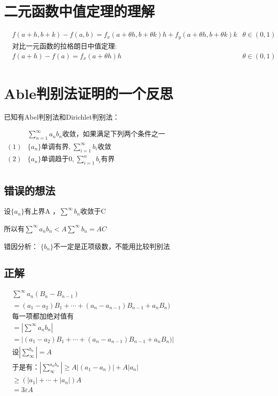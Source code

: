 \documentclass[fontset=windows]{article}
\begin{document}
    \section{二元函数中值定理的理解}
    \begin{align*}
     & f(a+h, b+k) - f(a, b) = f_x(a+\theta h, b + \theta k)h + f_y(a+\theta h, b + \theta k)k &\theta \in (0, 1)\\
     & \text{对比一元函数的拉格朗日中值定理:} \\
     & f(a+h) - f(a) = f_x(a+\theta h)h &\theta \in (0, 1)\\
    \end{align*}
    \section{Able判别法证明的一个反思}
    已知有Abel判别法和Dirichlet判别法：
    \begin{tcolorbox}[colback=blue!5!white,colframe=blue!75!black,title=Abel~Dirichlet判别法]
        \raggedright
        $
        \begin{aligned}
        &\sum_{n=1}^{\infty}{a_nb_n}\mbox{收敛，如果满足下列两个条件之一} \nonumber \\
        (1)&\{a_n\}\mbox{单调有界,}~\sum_{i=1}^{\infty}{b_i}\mbox{收敛} \\
        (2)& \{a_n\}\mbox{单调趋于0,}~\sum_{i=1}^{n}{b_i}\mbox{有界} \\
        \nonumber
        \end{aligned}
        $
    \end{tcolorbox}


    \subsection{错误的想法}
    设$\{a_n\}$有上界A ，$\sum\limits_{}^{\infty}{b_n}$收敛于C

    所以有$\sum\limits_{}^{\infty}{a_nb_n}<A \sum\limits_{}^{\infty}{b_n}=AC$


    错因分析： $\{b_n\}$不一定是正项级数，不能用比较判别法
    \subsection{正解}
    $
    \begin{aligned}
        &\sum_{}^{\infty}{a_n(B_n-B_{n-1})}\nonumber\\
        &=(a_1-a_2)B_1+\cdots+(a_n-a_{n-1})B_{n-1}+a_nB_n)\nonumber\\
        & \mbox{每一项都加绝对值有}\nonumber\\
        &=|\sum_{}^{\infty}{a_nb_n}|\nonumber\\
        & =|(a_1-a_2)B_1+\cdots+(a_n-a_{n-1})B_{n-1}+a_nB_n)|\nonumber\\
        & \mbox{设}|\sum_{\infty}^{b_n}|=A\nonumber\\
        & \mbox{于是有：}|\sum_{\infty}^{a_nb_n}|\ge A|(a_1-a_n)|+A|a_n|\nonumber\\
        & \ge (|a_1|+\cdots+ |a_n|)A\nonumber\\
        & =3\varepsilon A\nonumber
    \end{aligned}
    $
\end{document}
